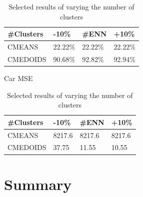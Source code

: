 \documentclass[twoside,11pt]{article}
\begin{document}
\begin{table}[ht]
\begin{minipage}[b]{0.45\linewidth}
\begin{tabular}{llll}
			\hline
			\#Clusters & -10\% & \#ENN   & +10\% \\ \hline
			CMEANS     & 22.22\%      & 22.22\% & 22.22\%      \\
			CMEDOIDS   & 90.68\%      & 92.82\% & 92.94\%
		\end{tabular}
	\end{minipage}
	\hspace{0.5cm}
	\begin{minipage}[b]{0.45\linewidth}
		Car MSE
		\centering
		\begin{tabular}{llll}
			\hline
			\#Clusters & -10\% & \#ENN  & +10\% \\ \hline
			CMEANS     & 8217.6       & 8217.6 & 8217.6       \\
			CMEDOIDS   & 37.75        & 11.55  & 10.55
		\end{tabular}
	\end{minipage}
	\caption{Selected results of varying the number of clusters}
\end{table}


\section{Summary}




\end{document}
